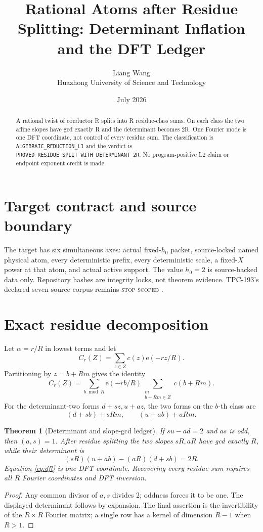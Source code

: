 \documentclass[11pt]{article}
\title{\textbf{Rational Atoms after Residue Splitting: Determinant Inflation and the DFT Ledger}}
\author{Liang Wang\\Huazhong University of Science and Technology}
\date{July 2026}
\newtheorem{theorem}{Theorem}
\newcommand{\e}{\mathrm{e}}
\begin{document}
\maketitle
\begin{abstract}
A rational twist of conductor R splits into R residue-class sums. On each class the two affine slopes have gcd exactly R and the determinant becomes 2R.  One Fourier mode is one DFT coordinate, not control of every residue sum.
The classification is \texttt{ALGEBRAIC\_\allowbreak{}REDUCTION\_\allowbreak{}L1} and the
verdict is \texttt{PROVED\_\allowbreak{}RESIDUE\_\allowbreak{}SPLIT\_\allowbreak{}WITH\_\allowbreak{}DETERMINANT\_\allowbreak{}2R}.  No program-positive L2
claim or endpoint exponent credit is made.
\end{abstract}

\section{Target contract and source boundary}
The target has six simultaneous axes: actual fixed-\(h_0\) packet,
source-locked named physical atom, every deterministic prefix, every
deterministic scale, a fixed-\(X\) power at that atom, and actual active
support.  The value \(h_0=2\) is source-backed data only.  Repository hashes
are integrity locks, not theorem evidence.  TPC-193's declared seven-source
corpus remains \textsc{stop-scoped} \citep{WangTPC193}.


\section{Exact residue decomposition}
Let \(\alpha=r/R\) in lowest terms and let
\[
 C_r(Z)=\sum_{z\in Z}c(z)\e(-rz/R).
\]
Partitioning by \(z=b+Rm\) gives the identity
\begin{equation}\label{eq:dft}
 C_r(Z)=\sum_{b\bmod R}\e(-rb/R)
 \sum_{\substack{m\\b+Rm\in Z}}c(b+Rm).
\end{equation}
For the determinant-two forms \(d+sz,u+az\), the two forms on the
\(b\)-th class are
\[
 (d+sb)+sRm,\qquad (u+ab)+aRm.
\]

\begin{theorem}[Determinant and slope-gcd ledger]
If \(su-ad=2\) and \(as\) is odd, then \((a,s)=1\).  After residue
splitting the two slopes \(sR,aR\) have gcd exactly \(R\), while their
determinant is
\[
 (sR)(u+ab)-(aR)(d+sb)=2R.
\]
Equation \eqref{eq:dft} is one DFT coordinate.  Recovering every residue sum
requires all \(R\) Fourier coordinates and DFT inversion.
\end{theorem}
\begin{proof}
Any common divisor of \(a,s\) divides \(2\); oddness forces it to be one.
The displayed determinant follows by expansion.  The final assertion is
the invertibility of the \(R\times R\) Fourier matrix; a single row has a
kernel of dimension \(R-1\) when \(R>1\).
\end{proof}
\end{document}
